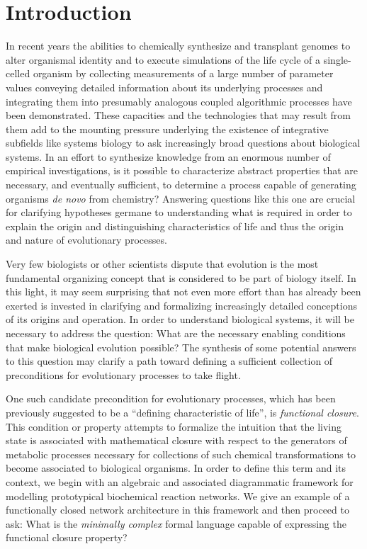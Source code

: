 \documentclass[10pt]{article}
\theoremstyle{plain}
\theoremstyle{definition}
\theoremstyle{remark}
\begin{document}
\section{Introduction}
In recent years the abilities to chemically synthesize and transplant genomes to alter organismal identity \cite{Gibson2010} and to execute simulations of the life cycle of a single-celled organism \cite{Karr2012} by collecting measurements of a large number of parameter values conveying detailed information about its underlying processes and integrating them into presumably analogous coupled algorithmic processes have been demonstrated. These capacities and the technologies that may result from them add to the mounting pressure underlying the existence of integrative subfields like systems biology to ask increasingly broad questions about biological systems. In an effort to synthesize knowledge from an enormous number of empirical investigations, is it possible to characterize abstract properties that are necessary, and eventually sufficient, to determine a process capable of generating organisms \emph{de novo} from chemistry? Answering questions like this one are crucial for clarifying hypotheses germane to understanding what is required in order to explain the origin and distinguishing characteristics of life and thus the origin and nature of evolutionary processes.

Very few biologists or other scientists dispute that evolution is the most fundamental organizing concept that is considered to be part of biology itself. In this light, it may seem surprising that not even more effort than has already been exerted is invested in clarifying and formalizing increasingly detailed conceptions of its origins and operation. In order to understand biological systems, it will be necessary to address the question: What are the necessary enabling conditions that make biological evolution possible? The synthesis of some potential answers to this question may clarify a path toward defining a sufficient collection of preconditions for evolutionary processes to take flight.

One such candidate precondition for evolutionary processes, which has been previously suggested to be a ``defining characteristic of life''\cite{Rosen1972,Rosen1978,Rosen1985,Rosen1991}, is \emph{functional closure}. This condition or property attempts to formalize the intuition that the living state is associated with mathematical closure with respect to the generators of metabolic processes necessary for collections of such chemical transformations to become associated to biological organisms. In order to define this term and its context, we begin with an algebraic and associated diagrammatic framework for modelling prototypical biochemical reaction networks. We give an example of a functionally closed network architecture in this framework and then proceed to ask: What is the \emph{minimally complex} formal language capable of expressing the functional closure property?
\end{document}
